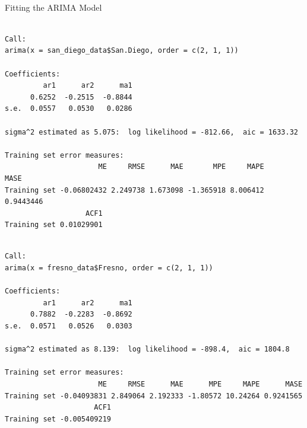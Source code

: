 \documentclass[
  11pt,
]{article}
\makeatletter
\let\oldparagraph\paragraph
\renewcommand{\paragraph}{
    \@ifstar
      \xxxParagraphStar
      \xxxParagraphNoStar
  }
\newcommand{\xxxParagraphStar}[1]{\oldparagraph*{#1}\mbox{}}
\newcommand{\xxxParagraphNoStar}[1]{\oldparagraph{#1}\mbox{}}
\newenvironment{Shaded}{\begin{snugshade}}{\end{snugshade}}
\newcommand{\AttributeTok}[1]{\textcolor[rgb]{0.40,0.45,0.13}{#1}}
\newcommand{\CommentTok}[1]{\textcolor[rgb]{0.37,0.37,0.37}{#1}}
\newcommand{\DecValTok}[1]{\textcolor[rgb]{0.68,0.00,0.00}{#1}}
\newcommand{\FunctionTok}[1]{\textcolor[rgb]{0.28,0.35,0.67}{#1}}
\newcommand{\NormalTok}[1]{\textcolor[rgb]{0.00,0.23,0.31}{#1}}
\newcommand{\OtherTok}[1]{\textcolor[rgb]{0.00,0.23,0.31}{#1}}
\newcommand{\SpecialCharTok}[1]{\textcolor[rgb]{0.37,0.37,0.37}{#1}}
\makeatother
\begin{document}
\paragraph{Fitting the ARIMA Model}\label{fitting-the-arima-model}

\begin{Shaded}
\end{Shaded}

\begin{verbatim}

Call:
arima(x = san_diego_data$San.Diego, order = c(2, 1, 1))

Coefficients:
         ar1      ar2      ma1
      0.6252  -0.2515  -0.8844
s.e.  0.0557   0.0530   0.0286

sigma^2 estimated as 5.075:  log likelihood = -812.66,  aic = 1633.32

Training set error measures:
                      ME     RMSE      MAE       MPE     MAPE      MASE
Training set -0.06802432 2.249738 1.673098 -1.365918 8.006412 0.9443446
                   ACF1
Training set 0.01029901
\end{verbatim}

\begin{Shaded}
\end{Shaded}

\begin{verbatim}

Call:
arima(x = fresno_data$Fresno, order = c(2, 1, 1))

Coefficients:
         ar1      ar2      ma1
      0.7882  -0.2283  -0.8692
s.e.  0.0571   0.0526   0.0303

sigma^2 estimated as 8.139:  log likelihood = -898.4,  aic = 1804.8

Training set error measures:
                      ME     RMSE      MAE      MPE     MAPE      MASE
Training set -0.04093831 2.849064 2.192333 -1.80572 10.24264 0.9241565
                     ACF1
Training set -0.005409219
\end{verbatim}
\end{document}
